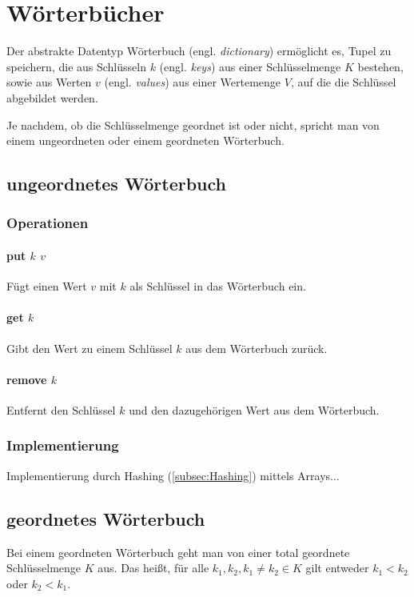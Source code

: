 \section{Wörterbücher}

Der abstrakte Datentyp Wörterbuch (engl. \textit{dictionary}) ermöglicht es, Tupel zu speichern,
die aus Schlüsseln $k$ (engl. \textit{keys}) aus einer Schlüsselmenge $K$ bestehen,
sowie aus Werten $v$ (engl. \textit{values}) aus einer Wertemenge $V$,
auf die die Schlüssel abgebildet werden.

Je nachdem, ob die Schlüsselmenge geordnet ist oder nicht,
spricht man von einem ungeordneten oder einem geordneten Wörterbuch.

%
%
\subsection{ungeordnetes Wörterbuch}

\subsubsection{Operationen}
\paragraph{put $k$ $v$} Fügt einen Wert $v$ mit $k$ als Schlüssel in das Wörterbuch ein.
\paragraph{get $k$} Gibt den Wert zu einem Schlüssel $k$ aus dem Wörterbuch zurück.
\paragraph{remove $k$} Entfernt den Schlüssel $k$ und den dazugehörigen Wert aus dem Wörterbuch.

\subsubsection{Implementierung}

Implementierung durch Hashing (\ref{subsec:Hashing}) mittels Arrays...

%
%
\subsection{geordnetes Wörterbuch}

Bei einem geordneten Wörterbuch geht man von einer total geordnete Schlüsselmenge $K$ aus.
Das heißt, für alle $k_1, k_2, k_1 \neq k_2 \in K$ gilt entweder $k_1 < k_2$ oder $k_2 < k_1$.


